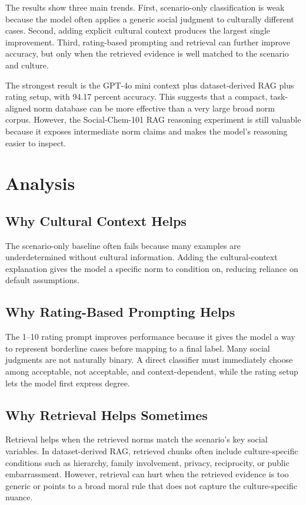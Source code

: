 \documentclass{article}
\begin{document}
The results show three main trends. First, scenario-only classification is weak because the model often applies a generic social judgment to culturally different cases. Second, adding explicit cultural context produces the largest single improvement. Third, rating-based prompting and retrieval can further improve accuracy, but only when the retrieved evidence is well matched to the scenario and culture.

The strongest result is the GPT-4o mini context plus dataset-derived RAG plus rating setup, with 94.17 percent accuracy. This suggests that a compact, task-aligned norm database can be more effective than a very large broad norm corpus. However, the Social-Chem-101 RAG reasoning experiment is still valuable because it exposes intermediate norm claims and makes the model's reasoning easier to inspect.

\section{Analysis}

\subsection{Why Cultural Context Helps}

The scenario-only baseline often fails because many examples are underdetermined without cultural information. Adding the cultural-context explanation gives the model a specific norm to condition on, reducing reliance on default assumptions.

\subsection{Why Rating-Based Prompting Helps}

The 1--10 rating prompt improves performance because it gives the model a way to represent borderline cases before mapping to a final label. Many social judgments are not naturally binary. A direct classifier must immediately choose among acceptable, not acceptable, and context-dependent, while the rating setup lets the model first express degree.

\subsection{Why Retrieval Helps Sometimes}

Retrieval helps when the retrieved norms match the scenario's key social variables. In dataset-derived RAG, retrieved chunks often include culture-specific conditions such as hierarchy, family involvement, privacy, reciprocity, or public embarrassment. However, retrieval can hurt when the retrieved evidence is too generic or points to a broad moral rule that does not capture the culture-specific nuance.
\end{document}
